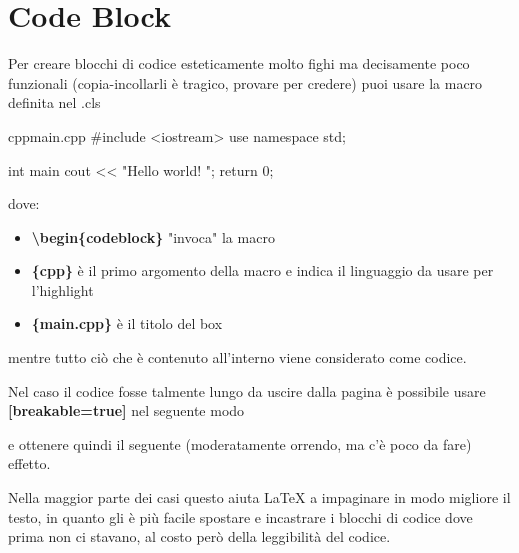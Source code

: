 \chapter{Code Block}

Per creare blocchi di codice esteticamente molto fighi ma decisamente poco funzionali (copia-incollarli è tragico, provare per credere) puoi usare la macro definita nel .cls 

\begin{codeblock}{cpp}{main.cpp}
#include <iostream>
use namespace std;

int main{
    cout << "Hello world! \n";
    return 0;
}
\end{codeblock}

dove:
\begin{itemize}
    \item \textbf{\textbackslash begin\{codeblock\}} "invoca" la macro
    \item \textbf{\{cpp\}} è il primo argomento della macro e indica il linguaggio da usare per l'highlight
    \item \textbf{\{main.cpp\}} è il titolo del box
\end{itemize}

mentre tutto ciò che è contenuto all'interno viene considerato come codice.

Nel caso il codice fosse talmente lungo da uscire dalla pagina è possibile usare \textbf{[breakable=true]} nel seguente modo


e ottenere quindi il seguente (moderatamente orrendo, ma c'è poco da fare) effetto.

Nella maggior parte dei casi questo aiuta LaTeX a impaginare in modo migliore il testo, in quanto gli è più facile spostare e incastrare i blocchi di codice dove prima non ci stavano, al costo però della leggibilità del codice.